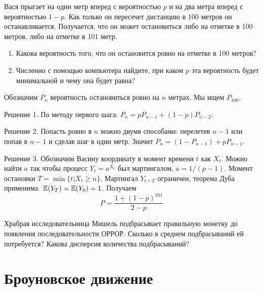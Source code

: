 \begin{problem}
Вася прыгает на один метр вперед с вероятностью $p$ и на два метра вперед с вероятностью $1-p$. Как только он пересечет дистанцию в 100 метров он останавливается. Получается, что он может остановиться либо на отметке в 100 метров, либо на отметке в 101 метр.
\begin{enumerate}
\item Какова вероятность того, что он остановится ровно на отметке в 100 метров?
\item Численно с помощью компьютера найдите, при каком $p$ эта вероятность будет минимальной и чему она будет равна?
\end{enumerate}

\begin{sol}
Обозначим $P_n$ вероятность остановиться ровно на $n$ метрах. Мы ищем $P_{100}$.

Решение 1. По методу первого шага:  $P_n=pP_{n-1}+(1-p)P_{n-2}$.

Решение 2. Попасть ровно в $n$ можно двумя способами: перелетев $n-1$ или попав в $n-1$ и сделав шаг в один метр. Значит $P_n=(1-P_{n-1})+pP_{n-1}$.

Решение 3. Обозначим Васину координату в момент времени $t$ как $X_t$. Можно найти $a$ так чтобы процесс $Y_t=a^{X_t}$ был мартингалом, $a=1/(p-1)$. Момент остановки $T=\min\{t|X_t\geq n\}$. Мартингал $Y_{t\wedge T}$ ограничен, теорема Дуба применима. $\mathbb{E}(Y_T)=\mathbb{E}(Y_0)=1$. Получаем
\[
P=\frac{1+(1-p)^{101}}{2-p}
\]

\end{sol}
\end{problem}


\begin{problem}
Храбрая исследовательница Мишель подбрасывает правильную монетку до появления последовательности ОРРОР. Сколько в среднем подбрасываний ей потребуется? Какова дисперсия количества подбрасываний?


\begin{sol}
\end{sol}
\end{problem}

\section{Броуновское движение}

